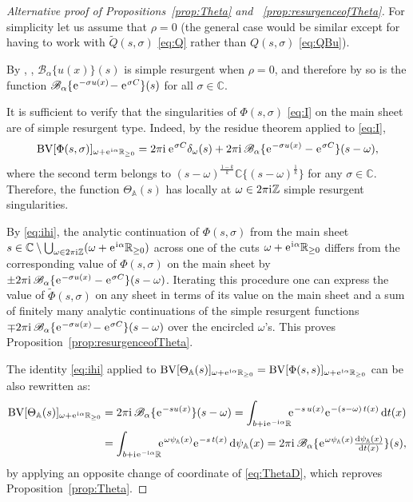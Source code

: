 \documentclass[a4paper,11pt]{amsart}
\numberwithin{equation}{section}
\newcommand{\C}{{\mathbb C}}
\newcommand{\Z}{{\mathbb Z}}
\newcommand{\R}{{\mathbb R}}
\newcommand{\sminus}{\setminus} %
\renewcommand{\i}{\mathrm{i}\mkern.25\thinmuskip}
\renewcommand{\d}{\ensuremath{\operatorname{d}\!}}
\newcommand{\e}{\ensuremath{\mkern.25\thinmuskip\mathrm{e}\mkern.4\thinmuskip}}
\newcommand{\orbit}{\mathbb{A}}
\newcommand{\Borel}{\mathscr{B}}
\newcommand{\BV}{\operatorname{BV}}
\theoremstyle{definition}
\begin{document}
\begin{proof}[Alternative proof of Propositions~\ref{prop:Theta} and ~\ref{prop:resurgenceofTheta}]
For simplicity let us assume that $\rho=0$ (the general case would be similar except for having to work with $\tilde Q(s,\sigma)$ \eqref{eq:Q} rather than $Q(s,\sigma)$ \eqref{eq:QBu}).

By \cite[Proposition 9b1]{Ecalle2}, \cite[Theorem 7.6]{MitschiSauzin},  $\Borel_\alpha\{u(x)\}(s)$ is simple resurgent when $\rho=0$, and therefore by \cite[Theorem 6.32]{MitschiSauzin} so is the function $\Borel_{\alpha}\{\e^{-\sigma u(x)}\!-\e^{\sigma C}\}(s)$ for all $\sigma\in\C$. 


It is sufficient to verify that the singularities of $\Phi(s,\sigma)$ \eqref{eq:I} on the main sheet are of simple resurgent type. Indeed, by the residue theorem applied to \eqref{eq:I},
\begin{equation}\label{eq:ihi}
\BV[\Phi(s,\sigma)]_{\omega+\e^{\i\alpha}\R_{\geq 0}}=
2\pi\i\,\e^{\sigma C}\delta_\omega(s) + 
2\pi\i\,\Borel_\alpha\{\e^{-\sigma u(x)}-\e^{\sigma C}\}(s-\omega),
\end{equation}
where the second term belongs to $(s-\omega)^{\frac{1-k}{k}}\mathbb C\{(s-\omega)^{\frac1k}\}$ for any $\sigma\in\C$.
Therefore, the function $\Theta_\orbit(s)$ has locally at $\omega\in 2\pi\i\mathbb Z$ simple resurgent singularities. 

By \eqref{eq:ihi}, the analytic continuation of $\Phi(s,\sigma)$ from the main sheet $s\in\C\sminus\bigcup_{\omega\in 2\pi\i \Z}(\omega+\e^{\i\alpha}\R_{\geq 0})$ 
across one of the cuts $\omega+\e^{\i\alpha}\R_{\geq 0}$ differs from the corresponding value of $\Phi(s,\sigma)$ on the main sheet by  $\pm2\pi\i\,\Borel_\alpha\{\e^{-\sigma u(x)}-\e^{\sigma C}\}(s-\omega)$.
Iterating this procedure one can express the value of $\tilde\Phi(s,\sigma)$ on any sheet in terms of its value on the main sheet and a sum of finitely many analytic
continuations of the simple resurgent functions $\mp2\pi\i\,\Borel_{\alpha}\{\e^{-\sigma u(x)}\!-\e^{\sigma C}\}(s-\omega)$ over the encircled $\omega$'s. This proves Proposition~\ref{prop:resurgenceofTheta}.

The identity \eqref{eq:ihi} applied to $\BV[\Theta_\orbit(s)]_{\omega+\e^{\i\alpha}\R_{\geq 0}}=\BV[\Phi(s,s)]_{ \omega+\e^{\i\alpha}\R_{\geq 0}}$ can be also rewritten as:
\begin{align*}
 \BV[\Theta_\orbit(s)]_{\omega+\e^{\i\alpha}\R_{\geq 0}}&=
2\pi\i\,\Borel_\alpha\{\e^{-su(x)}\}(s-\omega)=
\int_{b+\i\e^{-\i\alpha}\R}\!\!\!\e^{-s\,u(x)}\e^{-(s-\omega)\,t(x)}\d t(x)\\
&=\int_{b+\i\e^{-\i\alpha}\R}\!\!\!\e^{\omega\psi_\orbit(x)}\e^{-s\,t(x)}\d \psi_\orbit(x)
=2\pi\i\,\Borel_\alpha\{\e^{\omega\psi_\orbit(x)}\tfrac{\d\psi_\orbit(x)}{\d t(x)}\}(s),   
\end{align*}
by applying an opposite change of coordinate of \eqref{eq:ThetaD}, 
which reproves Proposition~\ref{prop:Theta}.
\end{proof}
\end{document}
